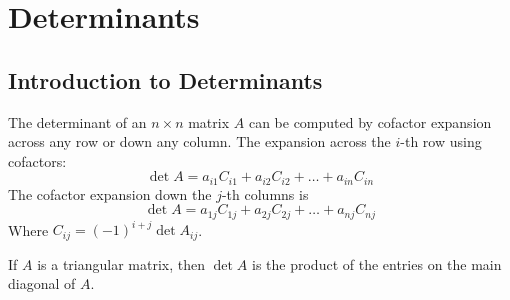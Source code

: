 \documentclass[11pt]{scrartcl}
\theoremstyle{dotlessP}
\theoremstyle{dotlessN}
\begin{document}
\section{Determinants}
\subsection{Introduction to Determinants}
\begin{theorem}
	The determinant of an $n \times n$ matrix $A$ can be computed by cofactor expansion across any row or down any column. The expansion across the $i$-th row using cofactors:
	\[
		\det A = a_{i1}C_{i1} + a_{i2}C_{i2} + \dots + a_{in}C_{in}
	\] 
	The cofactor expansion down the $j$-th columns is 
	\[
		\det A = a_{1j}C_{1j} + a_{2j}C_{2j} + \dots + a_{nj}C_{nj}
	\] 
	Where $C_{ij} = (-1)^{i + j}\det A_{ij}$.
\end{theorem}
\begin{theorem}
	If $A$ is a triangular matrix, then $\det A$ is the product of the entries on the main diagonal of $A$.
\end{theorem}
\end{document}
